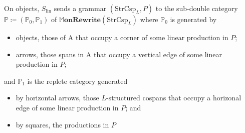 \documentclass{amsart}
\newcommand{\lin}{_{\textrm{lin}}}
\newcommand{\A}{\cat{A}}
\newcommand{\PPP}{\dblcat{P}}
\newcommand{\StrCsp}{\cat{StrCsp}}
\newcommand{\MMMonRewrite}{\dblcat{M}\bicat{onRewrite}}
\newcommand{\cat}[1]{\mathrm{#1}}
\newcommand{\bicat}[1]{\mathbf{#1}}
\newcommand{\dblcat}[1]{\mathbb{#1}}
\theoremstyle{remark}
\theoremstyle{definition}
\begin{document}
On objects, $ S\lin $ sends a grammar $ ( \StrCsp_L , P ) $ to the
sub-double category $ \PPP \coloneqq ( \PPP_0 , \PPP_1 ) $ of $
\MMMonRewrite ( \StrCsp_L ) $ where $ \PPP_0 $ is generated by
\begin{itemize}
\item objects, those of $ \A $ that occupy a corner of some linear
  production in $ P $;
\item arrows, those spans in $ \A $ that occupy a vertical
  edge of some linear production in $ P $;
\end{itemize}
and $ \PPP_1 $ is the replete category generated
\begin{itemize}
\item by horizontal arrows, those $ L $-structured cospans that
  occupy a horizonal edge of some linear production in $ P $; and
\item by squares, the productions in $ P $
\end{itemize}
\end{document}
